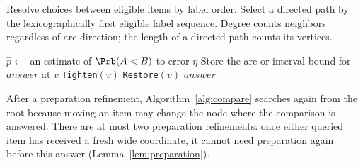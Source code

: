 Resolve choices between eligible items by label order. Select a directed
path by the lexicographically first eligible label sequence. Degree counts
neighbors regardless of arc direction; the length of a directed path
counts its vertices.

\begin{algorithm}[H]
\caption{\texttt{Restore}$(v)$: restore the degree and path-length bounds.}
\label{alg:restore}
\DontPrintSemicolon
{}
\end{algorithm}

\begin{algorithm}[H]
\caption{\texttt{Compare}$(A,B)$: the complete comparison procedure.}
\label{alg:compare}
\DontPrintSemicolon
{}
$\widehat p\gets$ an estimate of $\Prb(A<B)$ to error $\eta$\;
Store the arc or interval bound for $\mathit{answer}$ at $v$\;
\texttt{Tighten}$(v)$\;
\texttt{Restore}$(v)$\;
\Return $\mathit{answer}$\;
\end{algorithm}

After a preparation refinement, Algorithm~\ref{alg:compare} searches again
from the root because moving an item may change the node where the
comparison is answered. There are at most two preparation
refinements: once either queried item has received a fresh wide coordinate,
it cannot need preparation again before this answer
(Lemma~\ref{lem:preparation}).

